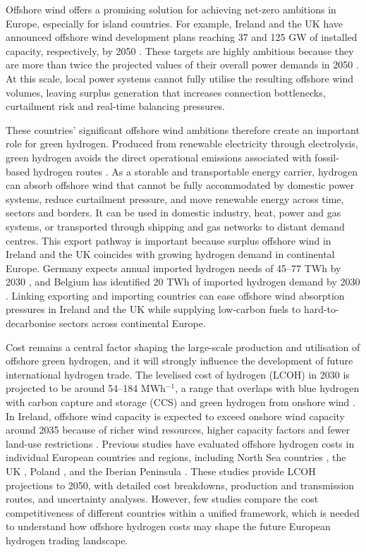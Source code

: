 \documentclass[pdflatex,sn-mathphys,Numbered]{sn-jnl}%
\begin{document}
Offshore wind offers a promising solution for achieving net-zero ambitions in Europe,
especially for island countries. For example, Ireland and the UK have announced
offshore wind development plans reaching 37 and 125 GW of installed capacity,
respectively, by 2050 \cite{FutureFrameworkfor, Offshorewindnetzero}. These targets
are highly ambitious because they are more than twice the projected values of their
overall power demands in 2050 \cite{TenYearGenerationCapacity, FES}. At this scale,
local power systems cannot fully utilise the resulting offshore wind volumes, leaving
surplus generation that increases connection bottlenecks, curtailment risk and
real-time balancing pressures.

These countries' significant offshore wind ambitions therefore create an important
role for green hydrogen. Produced from renewable electricity through electrolysis,
green hydrogen avoids the direct operational emissions associated with fossil-based
hydrogen routes \cite{Comparisonoftheemissions}. As a storable and transportable
energy carrier, hydrogen can absorb offshore wind that cannot be fully accommodated
by domestic power systems, reduce curtailment pressure, and move renewable energy
across time, sectors and borders. It can be used in domestic industry, heat, power
and gas systems, or transported through shipping and gas networks to distant demand
centres. This export pathway is important because surplus offshore wind in Ireland
and the UK coincides with growing hydrogen demand in continental Europe. Germany
expects annual imported hydrogen needs of 45--77 TWh by 2030
\cite{TheNationalHydrogenStrategy, HydrogenWhichimport}, and Belgium has identified
20 TWh of imported hydrogen demand by 2030 \cite{BelgianfederalHydrogenStrategy}.
Linking exporting and importing countries can ease offshore wind absorption pressures
in Ireland and the UK while supplying low-carbon fuels to hard-to-decarbonise sectors
across continental Europe.

Cost remains a central factor shaping the large-scale production and utilisation
of offshore green hydrogen, and it will strongly influence the development of
future international hydrogen trade. The levelised cost of hydrogen (LCOH) in
2030 is projected to be around 54--184 \texteuro{} MWh$^{-1}$, a range that overlaps with blue
hydrogen with carbon capture and storage (CCS) and green hydrogen from onshore
wind \cite{GlobalHydrogenReview2023}. In Ireland, offshore wind capacity is
expected to exceed onshore wind capacity around 2035 because of richer wind
resources, higher capacity factors and fewer land-use restrictions
\cite{windenergyroadmap}. Previous studies have evaluated offshore hydrogen
costs in individual European countries and regions, including North Sea countries
\cite{rogeau2023techno}, the UK \cite{giampieri2024techno}, Poland
\cite{komorowska2023evaluating}, and the Iberian Peninsula
\cite{gonzalez2024techno, calado2024assessment}. These studies provide LCOH
projections to 2050, with detailed cost breakdowns, production and transmission
routes, and uncertainty analyses. However, few studies compare the cost
competitiveness of different countries within a unified framework, which is
needed to understand how offshore hydrogen costs may shape the future European
hydrogen trading landscape.
\end{document}
